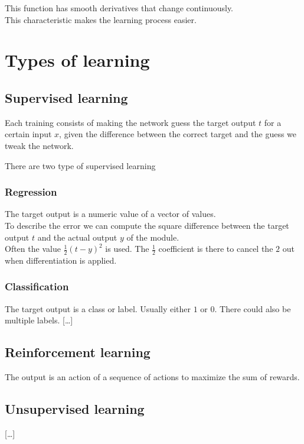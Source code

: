 \documentclass{article}
\begin{document}
This function has smooth derivatives that change continuously. \\
This characteristic makes the learning process easier.

\pagebreak


\section{Types of learning}

\subsection{Supervised learning}
Each training consists of making the network guess the target output \(t\) for a certain input \(x\), given the difference between the correct target and the guess we tweak the network.

There are two type of supervised learning

\subsubsection{Regression}
The target output is a numeric value of a vector of values. \\
To describe the error we can compute the square difference between the target output \(t\) and the actual output \(y\) of the module. \\
Often the value \(\frac{1}{2}{(t-y)}^2\) is used. The \(\frac{1}{2}\) coefficient is there to cancel the \(2\) out when differentiation is applied.

\subsubsection{Classification}
The target output is a class or label. Usually either \(1\) or \(0\).
There could also be multiple labels.
[\ldots]

\subsection{Reinforcement learning}
The output is an action of a sequence of actions to maximize the sum of rewards.

\subsection{Unsupervised learning}
[\ldots]
\end{document}
